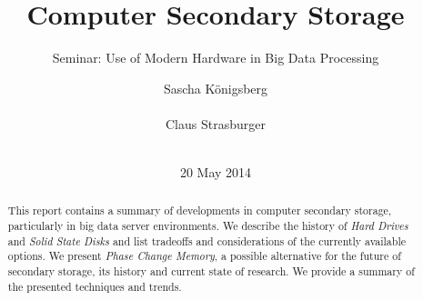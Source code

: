 \documentclass{acm_proc_article-sp}
\begin{document}
\title{Computer Secondary Storage}
\subtitle{Seminar: Use of Modern Hardware in Big Data Processing}
%
%
%
%
%

%
\author{
%
%
\alignauthor
Sascha K{\"o}nigsberg\\
       \\
\alignauthor
Claus Strasburger\\
       \\
}

\date{20 May 2014}

\maketitle
\begin{abstract}
This report contains a summary of developments in computer secondary storage, particularly in big data server environments. We describe the history of \emph{Hard Drives} and \emph{Solid State Disks} and list tradeoffs and considerations of the currently available options. We present \emph{Phase Change Memory}, a possible alternative for the future of secondary storage, its history and current state of research. We provide a summary of the presented techniques and trends.%
\end{abstract}
\end{document}

